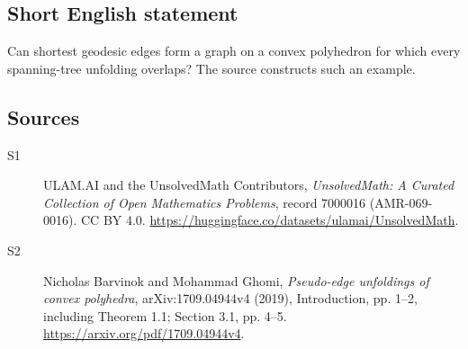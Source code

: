 \documentclass[11pt]{article}
\begin{document}
\subsection{Short English statement}
Can shortest geodesic edges form a graph on a convex polyhedron for which every spanning-tree unfolding overlaps? The source constructs such an example.
\subsection{Sources}
\begin{description}
\item[\hypertarget{source:7000016:1}{S1}] ULAM.AI and the UnsolvedMath Contributors, \emph{UnsolvedMath: A Curated Collection of Open Mathematics Problems}, record 7000016 (AMR-069-0016). CC BY 4.0. \url{https://huggingface.co/datasets/ulamai/UnsolvedMath}.
\item[\hypertarget{source:7000016:2}{S2}] Nicholas Barvinok and Mohammad Ghomi, \emph{Pseudo-edge unfoldings of convex polyhedra}, arXiv:1709.04944v4 (2019), Introduction, pp. 1--2, including Theorem 1.1; Section 3.1, pp. 4--5. \url{https://arxiv.org/pdf/1709.04944v4}.
\end{description}
\label{end:7000016}
\end{document}
